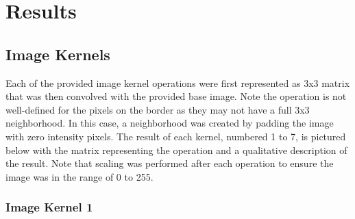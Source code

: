 \documentclass[12pt,letterpaper]{article}
\begin{document}
\newpage

\section{Results}

\subsection{Image Kernels}
Each of the provided image kernel operations were first represented as 3x3 matrix that was then convolved with the provided base image. Note the operation is not well-defined for the pixels on the border as they may not have a full 3x3 neighborhood. In this case, a neighborhood was created by padding the image with zero intensity pixels. The result of each kernel, numbered 1 to 7, is pictured below with the matrix representing the operation and a qualitative description of the result. Note that scaling was performed after each operation to ensure the image was in the range of 0 to 255.

\subsubsection{Image Kernel 1}
\end{document}
